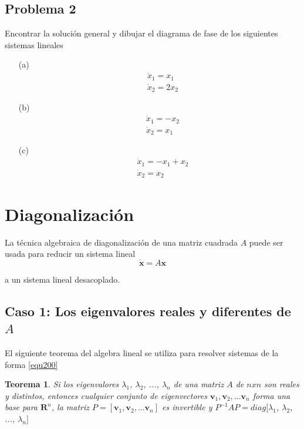 \documentclass[12pt]{book}
\newtheorem{thm}{Teorema}[section]
\theoremstyle{definition}
\theoremstyle{remark}
\theoremstyle{plain}
\begin{document}
\subsection{Problema 2}
Encontrar la solución general y dibujar el diagrama de fase de los siguientes sistemas lineales

\begin{enumerate}
\item[(a)]
\begin{align*}
 &\dot{x}_1  =  x_1 \\
 &\dot{x}_2  =  2x_2 
\end{align*}

\item[(b)]
\begin{align*}
&\dot{x}_1  = -x_2 \\
&\dot{x}_2  =  x_1
\end{align*}

\item[(c)]
\begin{align*}
&\dot{x}_1  =  -x_1+x_2 \\
&\dot{x}_2  =  x_2
\end{align*}
\end{enumerate}

\section{Diagonalización}

La técnica algebraica de diagonalización de una matriz cuadrada $A$ puede ser usada para reducir un sistema lineal 
\begin{equation*}
\mathbf{\dot{x}}=A \mathbf{x}
\end{equation*}

a un sistema lineal desacoplado.

\subsection{Caso 1: Los eigenvalores reales y diferentes de $A$}
El siguiente teorema del algebra lineal se utiliza para resolver sistemas de la forma \ref{equ200}

\begin{thm}
Si los eigenvalores $\lambda _1$, $\lambda _2$, ..., $\lambda _n$ de una matriz $A$ de $nxn$ son reales y distintos, entonces cualquier conjunto de eigenvectores {$ \mathbf{v}_1,\mathbf{v}_2,...\mathbf{v}_n $} forma una base para $\mathbf{R}^n$, la matriz $P=[\mathbf{v}_1,\mathbf{v}_2,...\mathbf{v}_n ]$ es invertible y
$
P^{-1}AP=diag[\lambda _1$, $\lambda _2$, ..., $\lambda _n]
$
\end{thm}
\end{document}
